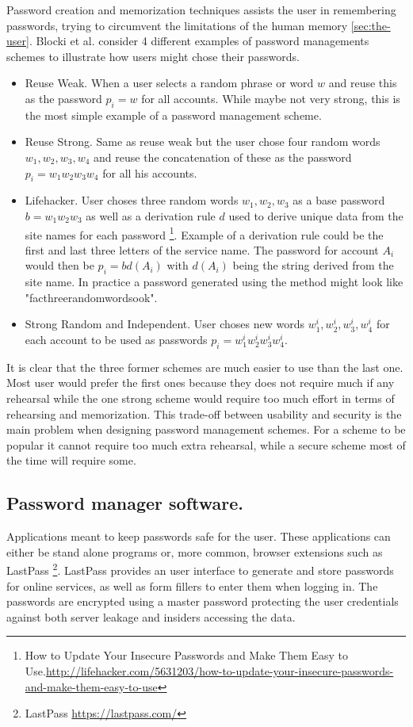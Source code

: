 Password creation and memorization techniques assists the user in remembering passwords, trying to circumvent the limitations of the human memory \autoref{sec:the-user}. Blocki et al. \cite{naturally-rehearsing} consider 4 different examples of password managements schemes to illustrate how users might chose their passwords.
\begin{itemize}
    \item{ Reuse Weak. } When a user selects a random phrase or word $w$ and reuse this as the password $p_i=w$ for all accounts. While maybe not very strong, this is the most simple example of a password management scheme.
    \item{ Reuse Strong. } Same as reuse weak but the user chose four random words $w_1,w_2,w_3,w_4$ and reuse the concatenation of these as the password $p_i = w_1w_2w_3w_4$ for all his accounts.
    \item{Lifehacker.} User choses three random words $w_1, w_2, w_3$ as a base password $b=w_1w_2w_3$ as well as a derivation rule $d$ used to derive unique data from the site names for each password \footnote{How to Update Your Insecure Passwords and Make Them Easy to Use.\url{http://lifehacker.com/5631203/how-to-update-your-insecure-passwords-and-make-them-easy-to-use}}. Example of a derivation rule could be the first and last three letters of the service name. The password for account $A_i$ would then be $p_i = b d(A_i)$ with $d(A_i)$ being the string derived from the site name. In practice a password generated using the method might look like "facthreerandomwordsook". 
    \item{Strong Random and Independent.} User choses new words $w^i_1, w^i_2, w^i_3, w^i_4$ for each account to be used as passwords $p_i = w^i_1w^i_2w^i_3w^i_4$.
\end{itemize}
It is clear that the three former schemes are much easier to use than the last one. Most user would prefer the first ones because they does not require much if any rehearsal while the one strong scheme would require too much effort in terms of rehearsing and memorization. This trade-off between usability and security is the main problem when designing password management schemes. For a scheme to be popular it cannot require too much extra rehearsal, while a secure scheme most of the time will require some.



\subsection{Password manager software.} Applications meant to keep passwords safe for the user. These applications can either be stand alone programs or, more common, browser extensions such as LastPass \footnote{LastPass \url{https://lastpass.com/}}. LastPass provides an user interface to generate and store passwords for online services, as well as form fillers to enter them when logging in. The passwords are encrypted using a master password protecting the user credentials against both server leakage and insiders accessing the data.

